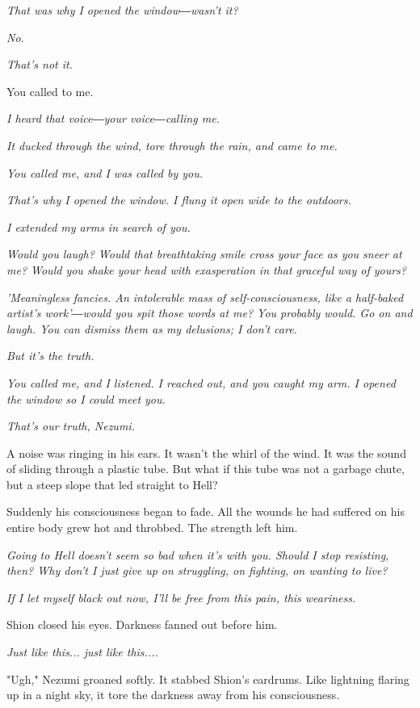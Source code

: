 \emph{That was why I opened the window―wasn't it?}

\emph{No.}

\emph{That's not it.}

You called to me.

\emph{I heard that voice―your voice―calling me.}

\emph{It ducked through the wind, tore through the rain, and came to me.}

\emph{You called me, and I was called by you.}

\emph{That's why I opened the window. I flung it open wide to the outdoors.}

\emph{I extended my arms in search of you.}

\emph{Would you laugh? Would that breathtaking smile cross your face as you
sneer at me? Would you shake your head with exasperation in that
graceful way of yours?}

\emph{'Meaningless fancies. An intolerable mass of self-consciousness, like a
half-baked artist's work'―would you spit those words at me? You probably
would. Go on and laugh. You can dismiss them as my delusions; I don't
care.}

\emph{But it's the truth.}

\emph{You called me, and I listened. I reached out, and you caught my arm. I
opened the window so I could meet you.}

\emph{That's our truth, Nezumi.}

A noise was ringing in his ears. It wasn't the whirl of the wind. It was
the sound of sliding through a plastic tube. But what if this tube was
not a garbage chute, but a steep slope that led straight to Hell?

Suddenly his consciousness began to fade. All the wounds he had suffered
on his entire body grew hot and throbbed. The strength left him.

\emph{Going to Hell doesn't seem so bad when it's with you. Should I stop
resisting, then? Why don't I just give up on struggling, on fighting, on
wanting to live?}

\emph{If I let myself black out now, I'll be free from this pain, this
weariness.}

Shion closed his eyes. Darkness fanned out before him.

\emph{Just like this... just like this....}

"Ugh," Nezumi groaned softly. It stabbed Shion's eardrums. Like
lightning flaring up in a night sky, it tore the darkness away from his
consciousness.

